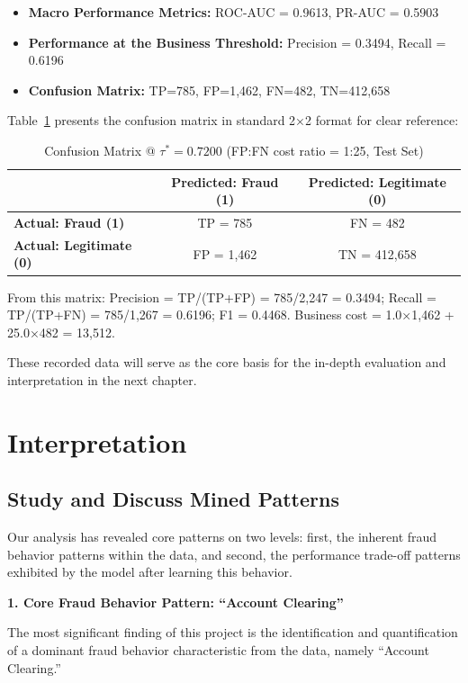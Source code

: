 \documentclass[sigplan,screen]{acmart}
\begin{document}
\begin{itemize}
\item \textbf{Macro Performance Metrics:} ROC-AUC = 0.9613, PR-AUC = 0.5903
\item \textbf{Performance at the Business Threshold:} Precision = 0.3494, Recall = 0.6196
\item \textbf{Confusion Matrix:} TP=785, FP=1,462, FN=482, TN=412,658
\end{itemize}

Table~\ref{tab:confusion-matrix} presents the confusion matrix in standard 2×2 format for clear reference:

\begin{table}[h]
\centering
\caption{Confusion Matrix @ $\tau^*=0.7200$ (FP:FN cost ratio = 1:25, Test Set)}
\label{tab:confusion-matrix}
\begin{tabular}{|l|c|c|}
\hline
\textbf{} & \textbf{Predicted: Fraud (1)} & \textbf{Predicted: Legitimate (0)} \\
\hline
\textbf{Actual: Fraud (1)} & TP = 785 & FN = 482 \\
\hline
\textbf{Actual: Legitimate (0)} & FP = 1,462 & TN = 412,658 \\
\hline
\end{tabular}
\end{table}

From this matrix: Precision = TP/(TP+FP) = 785/2,247 = 0.3494; Recall = TP/(TP+FN) = 785/1,267 = 0.6196; F1 = 0.4468. Business cost = 1.0×1,462 + 25.0×482 = 13,512.

These recorded data will serve as the core basis for the in-depth evaluation and interpretation in the next chapter.

\section{Interpretation}

\subsection{Study and Discuss Mined Patterns}

Our analysis has revealed core patterns on two levels: first, the inherent fraud behavior patterns within the data, and second, the performance trade-off patterns exhibited by the model after learning this behavior.

\textbf{1. Core Fraud Behavior Pattern: ``Account Clearing''}

The most significant finding of this project is the identification and quantification of a dominant fraud behavior characteristic from the data, namely ``Account Clearing.''
\end{document}
